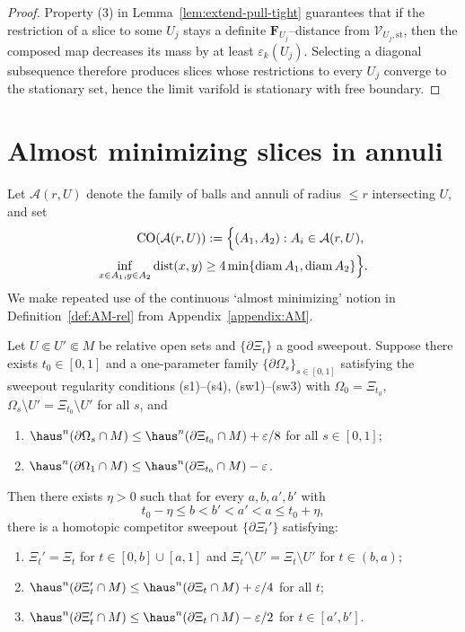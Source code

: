 \begin{proof}
Property (3) in Lemma~\ref{lem:extend-pull-tight} guarantees that if the restriction of a slice to some $U_j$ stays a definite $\mathbf{F}_{U_j}$--distance from $\mathcal{V}_{U_j,\mathrm{st}}$, then the composed map decreases its mass by at least $\varepsilon_k(U_j)$.  Selecting a diagonal subsequence therefore produces slices whose restrictions to every $U_j$ converge to the stationary set, hence the limit varifold is stationary with free boundary.
\end{proof}

\section{Almost minimizing slices in annuli}\label{sec:am-annuli}
Let $\mathcal{A}(r,U)$ denote the family of balls and annuli of radius $\le r$ intersecting $U$, and set
\begin{align*}
\mathrm{CO}(\mathcal{A}(r,U)):=\Bigl\{(A_1,A_2):A_i\in\mathcal{A}(r,U),\ \\
\inf_{x\in A_1,y\in A_2}\operatorname{dist}(x,y)\ge 4\min\{\operatorname{diam}A_1,\operatorname{diam}A_2\}\Bigr\}.
\end{align*}
We make repeated use of the continuous `almost minimizing' notion in Definition~\ref{def:AM-rel} from Appendix~\ref{appendix:AM}.

\begin{lemma}\label{lem:freeze-dynamic-rel}
Let $U\Subset U'\Subset M$ be relative open sets and $\{\partial\Xi_t\}$ a good sweepout.  Suppose there exists $t_0\in[0,1]$ and a one-parameter family $\{\partial\Omega_s\}_{s\in[0,1]}$ satisfying the sweepout regularity conditions (s1)--(s4), (sw1)--(sw3) with $\Omega_0=\Xi_{t_0}$, $\Omega_s\setminus U'=\Xi_{t_0}\setminus U'$ for all $s$, and
\begin{enumerate}[label=(\roman*)]
    \item $\haus^n(\partial\Omega_s\cap M)\le \haus^n(\partial\Xi_{t_0}\cap M)+\varepsilon/8$ for all $s\in[0,1]$;
    \item $\haus^n(\partial\Omega_1\cap M)\le \haus^n(\partial\Xi_{t_0}\cap M)-\varepsilon$.
\end{enumerate}
Then there exists $\eta>0$ such that for every $a,b,a',b'$ with
\[
t_0-\eta\le b<b'<a'<a\le t_0+\eta,
\]
there is a homotopic competitor sweepout $\{\partial\Xi_t'\}$ satisfying:
\begin{enumerate}[label=(\alph*)]
    \item $\Xi_t'=\Xi_t$ for $t\in[0,b]\cup[a,1]$ and $\Xi_t'\setminus U'=\Xi_t\setminus U'$ for $t\in(b,a)$;
    \item $\haus^n(\partial\Xi_t'\cap M)\le \haus^n(\partial\Xi_t\cap M)+\varepsilon/4$ for all $t$;
    \item $\haus^n(\partial\Xi_t'\cap M)\le \haus^n(\partial\Xi_t\cap M)-\varepsilon/2$ for $t\in[a',b']$.
\end{enumerate}
\end{lemma}

